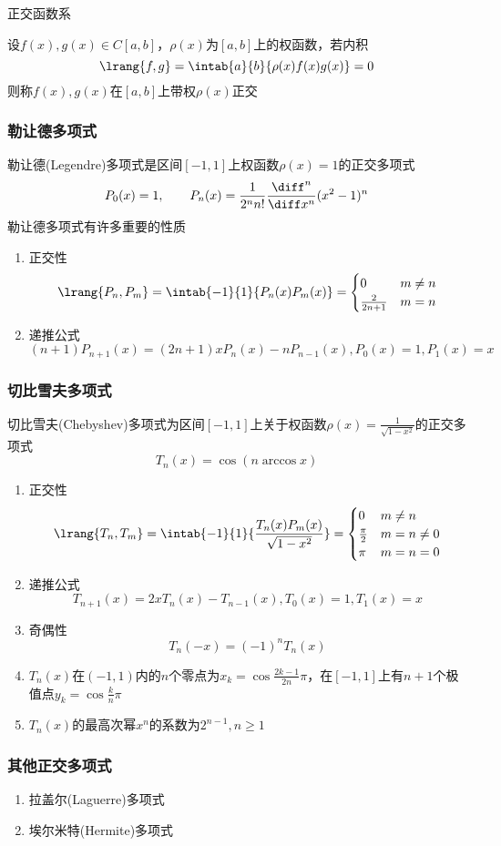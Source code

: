 正交函数系
\begin{definition}[正交]
    设$f(x),g(x)\in C[a,b]$，$\rho(x)$为$[a,b]$上的权函数，若内积
    \[\lrang{f,g}=\intab{a}{b}{\rho(x)f(x)g(x)}=0\]
    则称$f(x),g(x)$在$[a,b]$上带权$\rho(x)$正交
\end{definition}

\subsubsection{勒让德多项式}
勒让德(Legendre)多项式是区间$[-1,1]$上权函数$\rho(x)=1$的正交多项式
\[P_0(x)=1,\qquad P_n(x)=\frac{1}{2^nn!}\frac{\diff^n}{\diff x^n}(x^2-1)^n\]
勒让德多项式有许多重要的性质
\begin{enumerate}
    \item 正交性
\[\lrang{P_n,P_m}=\intab{-1}{1}{P_n(x)P_m(x)}=\begin{cases}0&m\ne n\\\frac{2}{2n+1}&m=n\end{cases}\]
    \item 递推公式
    \[(n+1)P_{n+1}(x)=(2n+1)xP_n(x)-nP_{n-1}(x),P_0(x)=1,P_1(x)=x\]
\end{enumerate}

\subsubsection{切比雪夫多项式}
切比雪夫(Chebyshev)多项式为区间$[-1,1]$上关于权函数$\rho(x)=\frac{1}{\sqrt{1-x^2}}$的正交多项式
\[T_n(x)=\cos(n\arccos x)\]
\begin{enumerate}
    \item 正交性
\[\lrang{T_n,T_m}=\intab{-1}{1}{\frac{T_n(x)P_m(x)}{\sqrt{1-x^2}}}=\begin{cases}0&m\ne n\\\frac{\pi}{2}&m=n\ne 0\\\pi&m=n=0\end{cases}\]
    \item 递推公式
\[T_{n+1}(x)=2xT_n(x)-T_{n-1}(x),T_0(x)=1,T_1(x)=x\]
    \item 奇偶性
\[T_n(-x)=(-1)^nT_n(x)\]
    \item $T_n(x)$在$(-1,1)$内的$n$个零点为$x_k=\cos\frac{2k-1}{2n}\pi$，在$[-1,1]$上有$n+1$个极值点$y_k=\cos\frac{k}{n}\pi$
    \item $T_n(x)$的最高次幂$x^n$的系数为$2^{n-1},n\geq 1$
\end{enumerate}

\subsubsection{其他正交多项式}
\begin{enumerate}
    \item 拉盖尔(Laguerre)多项式
    \item 埃尔米特(Hermite)多项式
\end{enumerate}